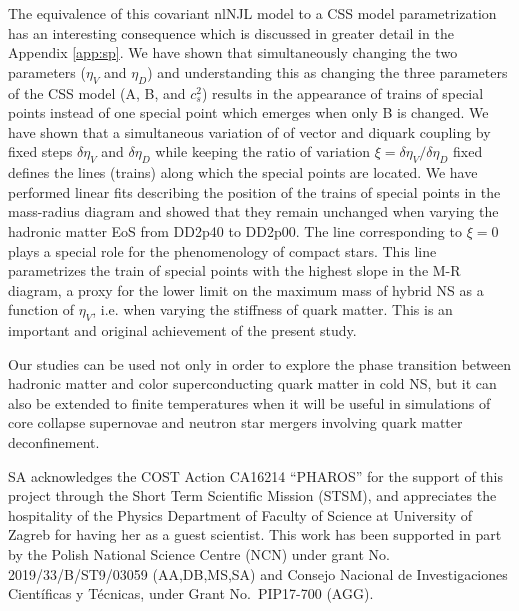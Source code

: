 \documentclass[%
 reprint,
superscriptaddress,
nofootinbib,
 amsmath,amssymb,
 aps,
]{revtex4-1}
\begin{document}
{The equivalence of this covariant nlNJL model to a CSS model 
parametrization has an interesting consequence which is discussed in greater detail in the Appendix \ref{app:sp}.
We have shown that simultaneously changing the two parameters ($\eta_V$ and $\eta_D$) and understanding this as changing the three parameters of the CSS model (A, B, and $c_s^2$) results in the appearance of trains of special points instead of one special point which emerges when only B is changed. 
We have shown that a simultaneous variation of of vector and diquark coupling by fixed steps  $\delta \eta_V$ and $\delta \eta_D$  while keeping the ratio of variation $\xi=\delta \eta_V/\delta \eta_D$ fixed defines the lines (trains) along which the special points are located. 
We have performed linear fits describing the position of the trains of special points in the mass-radius diagram and showed that they remain unchanged when varying the hadronic matter EoS from DD2p40 to DD2p00. 
The line corresponding to $\xi=0$ plays a special role for the phenomenology of compact stars. 
This line parametrizes the train of special points with the highest slope in the M-R diagram, a proxy for the lower limit on the maximum mass of hybrid NS as a function of $\eta_V$, i.e. when varying the stiffness of quark matter. This is an important and original achievement of the present study.}

Our studies can be used not only in order to explore the phase transition between hadronic matter and color superconducting quark matter in cold NS, but it can also be extended to finite temperatures when it will be useful in simulations of core collapse supernovae \cite{Fischer:2017lag}
and neutron star mergers \cite{Bauswein:2018bma,Bauswein:2020aag,Blacker:2020nlq} involving quark matter deconfinement.

\begin{acknowledgments}
SA acknowledges the COST Action CA16214 “PHAROS” for the support of this project through the Short Term Scientific Mission (STSM), and appreciates the hospitality of the Physics Department of Faculty of Science at University of Zagreb for having her as a guest scientist.
This work has been supported in part by the Polish National Science Centre (NCN) under grant No. 2019/33/B/ST9/03059 (AA,DB,MS,SA)
and Consejo Nacional de Investigaciones Cient\'ificas y T\'ecnicas, under Grant No.~PIP17-700 (AGG).
\end{acknowledgments}
\end{document}
